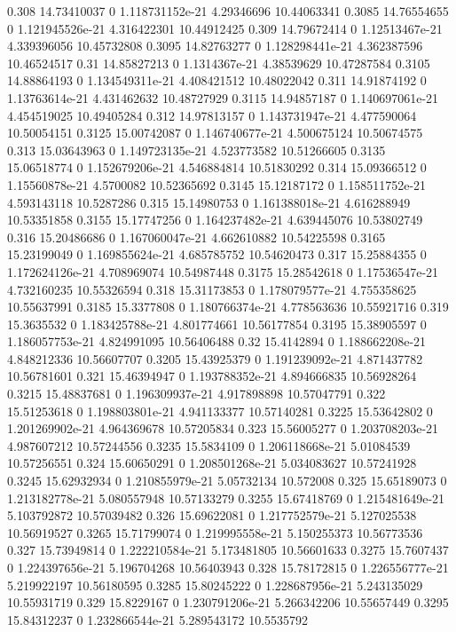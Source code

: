 {0.308 14.73410037 0 1.118731152e-21 4.29346696 10.44063341
0.3085 14.76554655 0 1.121945526e-21 4.316422301 10.44912425
0.309 14.79672414 0 1.12513467e-21 4.339396056 10.45732808
0.3095 14.82763277 0 1.128298441e-21 4.362387596 10.46524517
0.31 14.85827213 0 1.1314367e-21 4.38539629 10.47287584
0.3105 14.88864193 0 1.134549311e-21 4.408421512 10.48022042
0.311 14.91874192 0 1.13763614e-21 4.431462632 10.48727929
0.3115 14.94857187 0 1.140697061e-21 4.454519025 10.49405284
0.312 14.97813157 0 1.143731947e-21 4.477590064 10.50054151
0.3125 15.00742087 0 1.146740677e-21 4.500675124 10.50674575
0.313 15.03643963 0 1.149723135e-21 4.523773582 10.51266605
0.3135 15.06518774 0 1.152679206e-21 4.546884814 10.51830292
0.314 15.09366512 0 1.15560878e-21 4.5700082 10.52365692
0.3145 15.12187172 0 1.158511752e-21 4.593143118 10.5287286
0.315 15.14980753 0 1.161388018e-21 4.616288949 10.53351858
0.3155 15.17747256 0 1.164237482e-21 4.639445076 10.53802749
0.316 15.20486686 0 1.167060047e-21 4.662610882 10.54225598
0.3165 15.23199049 0 1.169855624e-21 4.685785752 10.54620473
0.317 15.25884355 0 1.172624126e-21 4.708969074 10.54987448
0.3175 15.28542618 0 1.17536547e-21 4.732160235 10.55326594
0.318 15.31173853 0 1.178079577e-21 4.755358625 10.55637991
0.3185 15.3377808 0 1.180766374e-21 4.778563636 10.55921716
0.319 15.3635532 0 1.183425788e-21 4.801774661 10.56177854
0.3195 15.38905597 0 1.186057753e-21 4.824991095 10.56406488
0.32 15.4142894 0 1.188662208e-21 4.848212336 10.56607707
0.3205 15.43925379 0 1.191239092e-21 4.871437782 10.56781601
0.321 15.46394947 0 1.193788352e-21 4.894666835 10.56928264
0.3215 15.48837681 0 1.196309937e-21 4.917898898 10.57047791
0.322 15.51253618 0 1.198803801e-21 4.941133377 10.57140281
0.3225 15.53642802 0 1.201269902e-21 4.964369678 10.57205834
0.323 15.56005277 0 1.203708203e-21 4.987607212 10.57244556
0.3235 15.5834109 0 1.206118668e-21 5.01084539 10.57256551
0.324 15.60650291 0 1.208501268e-21 5.034083627 10.57241928
0.3245 15.62932934 0 1.210855979e-21 5.05732134 10.572008
0.325 15.65189073 0 1.213182778e-21 5.080557948 10.57133279
0.3255 15.67418769 0 1.215481649e-21 5.103792872 10.57039482
0.326 15.69622081 0 1.217752579e-21 5.127025538 10.56919527
0.3265 15.71799074 0 1.219995558e-21 5.150255373 10.56773536
0.327 15.73949814 0 1.222210584e-21 5.173481805 10.56601633
0.3275 15.7607437 0 1.224397656e-21 5.196704268 10.56403943
0.328 15.78172815 0 1.226556777e-21 5.219922197 10.56180595
0.3285 15.80245222 0 1.228687956e-21 5.243135029 10.55931719
0.329 15.8229167 0 1.230791206e-21 5.266342206 10.55657449
0.3295 15.84312237 0 1.232866544e-21 5.289543172 10.5535792
}
